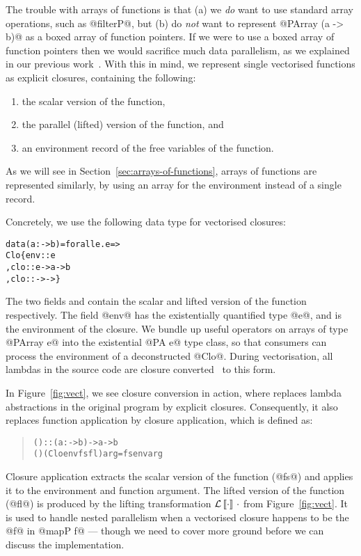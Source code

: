 The trouble with arrays of functions is that (a) we \emph{do} want to use standard array operations, such as @filterP@, but (b) do \emph{not} want to represent @PArray (a -> b)@ as a boxed array of function pointers. If we were to use a boxed array of function pointers then we would sacrifice much data parallelism, as we explained in our previous work~\cite{Jones08harnessingthe}. With this in mind, we represent single vectorised functions as explicit closures, containing the following:

\begin{enumerate}
\item the scalar version of the function,
\item the parallel (lifted) version of the function, and
\item an environment record of the free variables of the function.
\end{enumerate}

As we will see in Section~\ref{sec:arrays-of-functions}, arrays of functions are represented similarly, by using an array for the environment instead of a single record.

\eject
\noindent
Concretely, we use the following data type for vectorised closures:
%
\begin{alltt}
 data (a :-> b) = forall e. \pacls e => 
    Clo \{ env  :: e
        , clo :: e -> a -> b                      
        , clo ::  ->  ->  \}
\end{alltt}
%
The two fields  and  contain the scalar and lifted version of the function respectively. The field @env@ has the existentially quantified type @e@, and is the environment of the closure. We bundle up useful operators on arrays of type @PArray e@ into the existential @PA e@ type class, so that consumers can process the environment of a deconstructed @Clo@. During vectorisation, all lambdas in the source code are closure converted~\cite{appel-jim:CPS-CPS} to this form.

In Figure~\ref{fig:vect}, we see closure conversion in action, where \VT{\cdot} replaces lambda abstractions in the original program by explicit closures. Consequently, it also replaces function application by closure application, which is defined as:
%
\begin{quote}
\begin{alltt}
(\capp) :: (a :-> b) -> a -> b
(\capp) (Clo env fs fl) arg = fs env arg
\end{alltt}
\end{quote}
%
Closure application extracts the scalar version of the function (@fs@) and applies it to the environment and function argument. 
The lifted version of the function (@fl@) is produced by the lifting transformation \(\mathcal{L}\left\llbracket \cdot \right\rrbracket\,\cdot\) from Figure~\ref{fig:vect}. It is used to handle nested parallelism when a vectorised closure happens to be the @f@ in @mapP f@ --- though we need to cover more ground before we can discuss the implementation.



